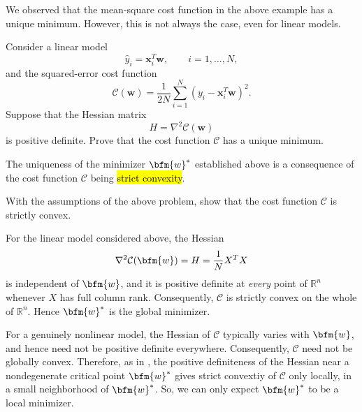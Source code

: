 We observed that the mean-square cost function in the above example has a unique minimum. However, this is not always the case, even for linear models.
\begin{problem}
Consider a linear model
$$
\widehat{y}_i=\mathbf{x}_i^{T}\mathbf{w},
\qquad i=1,\ldots,N,
$$
and the squared-error cost function
$$
\mathcal{C}(\mathbf{w})
=
\frac{1}{2N}\sum_{i=1}^{N}
\left(y_i-\mathbf{x}_i^{T}\mathbf{w}\right)^2.
$$
Suppose that the Hessian matrix
$$
H=\nabla^2\mathcal{C}(\mathbf{w})
$$
is positive definite. Prove that the cost function $\mathcal{C}$ has a unique minimum.

\end{problem}

The uniqueness of the minimizer $\bfm{w}^*$ established above is a consequence of the cost function $\mathcal{C}$ being \hl{strict convexity}. 
\begin{problem}
With the assumptions of the above problem, show that the cost function $\mathcal{C}$ is strictly convex.
\end{problem}

\begin{remark}

For the linear model considered above, the Hessian
$$
\nabla^2\mathcal{C}(\bfm{w})=H=\frac{1}{N}X^TX
$$
is independent of $\bfm{w}$, and it is positive definite at \emph{every} point of $\mathbb{R}^n$ whenever $X$ has full column rank. Consequently, $\mathcal{C}$ is strictly convex on the whole of $\mathbb{R}^n$. Hence $\bfm{w}^*$ is the global minimizer.

For a genuinely nonlinear model, the Hessian of $\mathcal{C}$ typically varies with $\bfm{w}$, and hence need not be positive definite everywhere. Consequently, $\mathcal{C}$ need not be globally convex.  Therefore, as in , the positive definiteness of the Hessian near a nondegenerate critical point $\bfm{w}^*$ gives strict convextiy of $\mathcal{C}$ only locally, in a small neighborhood of $\bfm{w}^*$. So, we can only expect $\bfm{w}^*$ to be a local minimizer.
\end{remark}
